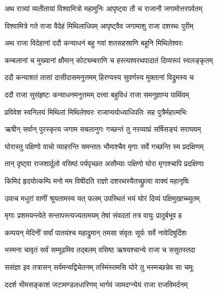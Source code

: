 
\twolineshloka
{अथ रात्र्यां व्यतीतायां विश्वामित्रो महामुनिः}
{आपृष्ट्वा तौ च राजानौ जगामोत्तरपर्वतम्} %

\twolineshloka
{विश्वामित्रे गते राजा वैदेहं मिथिलाधिपम्}
{आपृष्ट्वैव जगामाशु राजा दशरथः पुरीम्} %

\twolineshloka
{अथ राजा विदेहानां ददौ कन्याधनं बहु}
{गवां शतसहस्राणि बहूनि मिथिलेश्वरः} %

\twolineshloka
{कम्बलानां च मुख्यानां क्षौमान् कोट्यम्बराणि च}
{हस्त्यश्वरथपादातं दिव्यरूपं स्वलङ्कृतम्} %

\twolineshloka
{ददौ कन्याशतं तासां दासीदासमनुत्तमम्}
{हिरण्यस्य सुवर्णस्य मुक्तानां विद्रुमस्य च} %

\twolineshloka
{ददौ राजा सुसंहृष्टः कन्याधनमनुत्तमम्}
{दत्त्वा बहुविधं राजा समनुज्ञाप्य पार्थिवम्} %

\twolineshloka
{प्रविवेश स्वनिलयं मिथिलां मिथिलेश्वरः}
{राजाप्ययोध्याधिपतिः सह पुत्रैर्महात्मभिः} %

\twolineshloka
{ऋषीन् सर्वान् पुरस्कृत्य जगाम सबलानुगः}
{गच्छन्तं तु नरव्याघ्रं सर्षिसङ्घं सराघवम्} %

\twolineshloka
{घोरास्तु पक्षिणो वाचो व्याहरन्ति समन्ततः}
{भौमाश्चैव मृगाः सर्वे गच्छन्ति स्म प्रदक्षिणम्} %

\twolineshloka
{तान् दृष्ट्वा राजशार्दूलो वसिष्ठं पर्यपृच्छत}
{असौम्याः पक्षिणो घोरा मृगाश्चापि प्रदक्षिणाः} %

\twolineshloka
{किमिदं हृदयोत्कम्पि मनो मम विषीदति}
{राज्ञो दशरथस्यैतच्छ्रुत्वा वाक्यं महानृषिः} %

\twolineshloka
{उवाच मधुरां वाणीं श्रूयतामस्य यत् फलम्}
{उपस्थितं भयं घोरं दिव्यं पक्षिमुखाच्च्युतम्} %

\twolineshloka
{मृगाः प्रशमयन्त्येते सन्तापस्त्यज्यतामयम्}
{तेषां संवदतां तत्र वायुः प्रादुर्बभूव ह} %

\twolineshloka
{कम्पयन् मेदिनीं सर्वां पातयंश्च महाद्रुमान्}
{तमसा संवृतः सूर्यः सर्वे नावेदिषुर्दिशः} %

\twolineshloka
{भस्मना चावृतं सर्वं सम्मूढमिव तद्बलम्}
{वसिष्ठ ऋषयश्चान्ये राजा च ससुतस्तदा} %

\twolineshloka
{ससंज्ञा इव तत्रासन् सर्वमन्यद्विचेतनम्}
{तस्मिंस्तमसि घोरे तु भस्मच्छन्नेव सा चमूः} %

\twolineshloka
{ददर्श भीमसङ्काशं जटामण्डलधारिणम्}
{भार्गवं जामदग्न्येयं राजा राजविमर्दनम्} %

